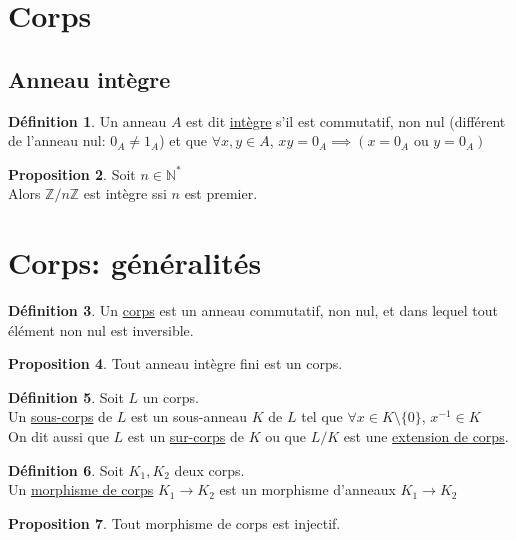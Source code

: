 \documentclass[10pt,a4paper]{article}
\theoremstyle{definition}
\newtheorem{proposition}{Proposition}[section]
\newtheorem{definition}[proposition]{Définition}
\begin{document}
\section{Corps}
\subsection{Anneau intègre}
\begin{definition}
Un anneau $A$ est dit \uline{intègre} s'il est commutatif, non nul (différent de l'anneau nul: $0_A \neq 1_A$) et que $\forall x, y \in A$, $xy = 0_A \implies (x = 0_A \text{ ou } y = 0_A)$
\end{definition}
\begin{proposition}
Soit $n \in \mathbb{N}^*$ \\
Alors $\mathbb{Z}/n\mathbb{Z}$ est intègre ssi $n$ est premier.
\end{proposition}

\section{Corps: généralités}
\begin{definition}
Un \uline{corps} est un anneau commutatif, non nul, et dans lequel tout élément non nul est inversible.
\end{definition}
\begin{proposition}
Tout anneau intègre fini est un corps.
\end{proposition}
\begin{definition}
Soit $L$ un corps. \\
Un \uline{sous-corps} de $L$ est un sous-anneau $K$ de $L$ tel que $\forall x \in K \setminus \{ 0 \}$, $x^{-1} \in K$ \\
On dit aussi que $L$ est un \uline{sur-corps} de $K$ ou que $L/K$ est une \uline{extension de corps}.
\end{definition}
\begin{definition}
Soit $K_1, K_2$ deux corps. \\
Un \uline{morphisme de corps} $K_1 \to K_2$ est un morphisme d'anneaux $K_1 \to K_2$
\end{definition}
\begin{proposition}
Tout morphisme de corps est injectif.
\end{proposition}
\end{document}

